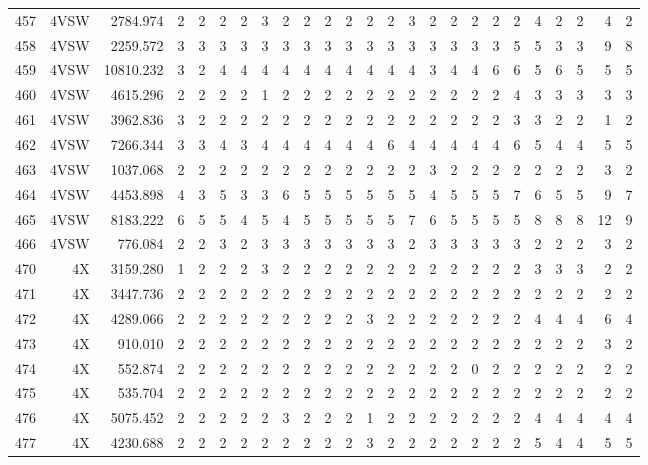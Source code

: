 \documentclass[12pt]{article}\usepackage[]{graphicx}\usepackage[]{color}
\begin{document}
\begin{landscape}
\begin{longtable}[t]{crrrrrrrrrrrrrrrcrrrrrrrr}
457 & 4VSW & 2784.974 & 2 & 2 & 2 & 2 & 3 & 2 & 2 & 2 & 2 & 2 & 2 & 3 & 2 & 2 & 2 & 2 & 2 & 4 & 2 & 2 & 4 & 2\\
458 & 4VSW & 2259.572 & 3 & 3 & 3 & 3 & 3 & 3 & 3 & 3 & 3 & 3 & 3 & 3 & 3 & 3 & 3 & 3 & 5 & 5 & 3 & 3 & 9 & 8\\
459 & 4VSW & 10810.232 & 3 & 2 & 4 & 4 & 4 & 4 & 4 & 4 & 4 & 4 & 4 & 4 & 3 & 4 & 4 & 6 & 6 & 5 & 6 & 5 & 5 & 5\\
460 & 4VSW & 4615.296 & 2 & 2 & 2 & 2 & 1 & 2 & 2 & 2 & 2 & 2 & 2 & 2 & 2 & 2 & 2 & 2 & 4 & 3 & 3 & 3 & 3 & 3\\
461 & 4VSW & 3962.836 & 3 & 2 & 2 & 2 & 2 & 2 & 2 & 2 & 2 & 2 & 2 & 2 & 2 & 2 & 2 & 2 & 3 & 3 & 2 & 2 & 1 & 2\\
462 & 4VSW & 7266.344 & 3 & 3 & 4 & 3 & 4 & 4 & 4 & 4 & 4 & 4 & 6 & 4 & 4 & 4 & 4 & 4 & 6 & 5 & 4 & 4 & 5 & 5\\
463 & 4VSW & 1037.068 & 2 & 2 & 2 & 2 & 2 & 2 & 2 & 2 & 2 & 2 & 2 & 2 & 3 & 2 & 2 & 2 & 2 & 2 & 2 & 2 & 3 & 2\\
464 & 4VSW & 4453.898 & 4 & 3 & 5 & 3 & 3 & 6 & 5 & 5 & 5 & 5 & 5 & 5 & 4 & 5 & 5 & 5 & 7 & 6 & 5 & 5 & 9 & 7\\
465 & 4VSW & 8183.222 & 6 & 5 & 5 & 4 & 5 & 4 & 5 & 5 & 5 & 5 & 5 & 7 & 6 & 5 & 5 & 5 & 5 & 8 & 8 & 8 & 12 & 9\\
466 & 4VSW & 776.084 & 2 & 2 & 3 & 2 & 3 & 3 & 3 & 3 & 3 & 3 & 3 & 2 & 3 & 3 & 3 & 3 & 3 & 2 & 2 & 2 & 3 & 2\\
470 & 4X & 3159.280 & 1 & 2 & 2 & 2 & 3 & 2 & 2 & 2 & 2 & 2 & 2 & 2 & 2 & 2 & 2 & 2 & 2 & 3 & 3 & 3 & 2 & 2\\
471 & 4X & 3447.736 & 2 & 2 & 2 & 2 & 2 & 2 & 2 & 2 & 2 & 2 & 2 & 2 & 2 & 2 & 2 & 2 & 2 & 2 & 2 & 2 & 2 & 2\\
472 & 4X & 4289.066 & 2 & 2 & 2 & 2 & 2 & 2 & 2 & 2 & 2 & 3 & 2 & 2 & 2 & 2 & 2 & 2 & 2 & 4 & 4 & 4 & 6 & 4\\
473 & 4X & 910.010 & 2 & 2 & 2 & 2 & 2 & 2 & 2 & 2 & 2 & 2 & 2 & 2 & 2 & 2 & 2 & 2 & 2 & 2 & 2 & 2 & 3 & 2\\
474 & 4X & 552.874 & 2 & 2 & 2 & 2 & 2 & 2 & 2 & 2 & 2 & 2 & 2 & 2 & 2 & 2 & 0 & 2 & 2 & 2 & 2 & 2 & 2 & 2\\
475 & 4X & 535.704 & 2 & 2 & 2 & 2 & 2 & 2 & 2 & 2 & 2 & 2 & 2 & 2 & 2 & 2 & 2 & 2 & 2 & 2 & 2 & 2 & 2 & 2\\
476 & 4X & 5075.452 & 2 & 2 & 2 & 2 & 2 & 3 & 2 & 2 & 2 & 1 & 2 & 2 & 2 & 2 & 2 & 2 & 2 & 4 & 4 & 4 & 4 & 4\\
477 & 4X & 4230.688 & 2 & 2 & 2 & 2 & 2 & 2 & 2 & 2 & 2 & 3 & 2 & 2 & 2 & 2 & 2 & 2 & 2 & 5 & 4 & 4 & 5 & 5\\

\end{longtable}
\end{landscape}
\end{document}
